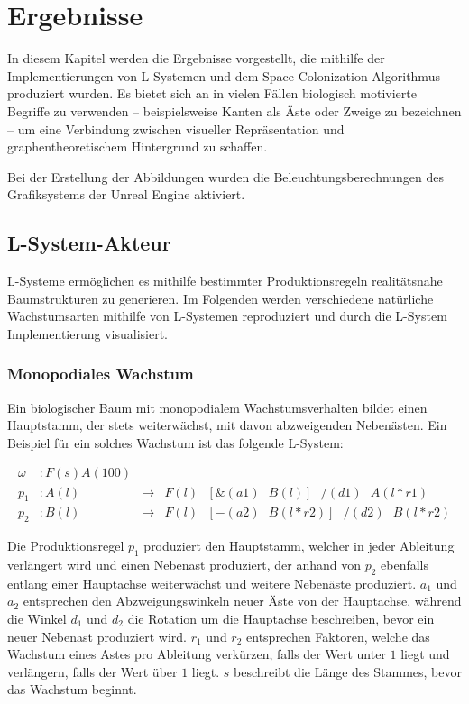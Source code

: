 \chapter{Ergebnisse}
In diesem Kapitel werden die Ergebnisse vorgestellt, die mithilfe der Implementierungen von L-Systemen und dem Space-Colonization Algorithmus produziert wurden. Es bietet sich an in vielen Fällen biologisch motivierte Begriffe zu verwenden -- beispielsweise Kanten als Äste oder Zweige zu bezeichnen -- um eine Verbindung zwischen visueller Repräsentation und graphentheoretischem Hintergrund zu schaffen.

Bei der Erstellung der Abbildungen wurden die Beleuchtungsberechnungen des Grafiksystems der Unreal Engine aktiviert.
\section{L-System-Akteur}
L-Systeme ermöglichen es mithilfe bestimmter Produktionsregeln realitätsnahe Baumstrukturen zu generieren. Im Folgenden werden verschiedene natürliche Wachstumsarten mithilfe von L-Systemen reproduziert und durch die L-System Implementierung visualisiert.
\subsection{Monopodiales Wachstum}
Ein biologischer Baum mit monopodialem Wachstumsverhalten bildet einen Hauptstamm, der stets weiterwächst, mit davon abzweigenden Nebenästen. \cite[S.21]{Forstbonatik:17} Ein Beispiel für ein solches Wachstum ist das folgende L-System:

\begin{equation}
\begin{array}{llll}
\omega & : F(s)A(100) \\
p_1 & : A(l) &\rightarrow& F(l)\text{ }[\&(a1)\text{ }B(l)]\text{ }/(d1)\text{ }A(l*r1) \\
p_2 &  : B(l) &\rightarrow& F(l)\text{ }[-(a2)\text{ }B(l*r2)]\text{ }/(d2)\text{ }B(l*r2)
\end{array}
\label{eq:ProdMonopodial}
\end{equation} 
\cite[S.56]{ABOP:04}

Die Produktionsregel $p_1$ produziert den Hauptstamm, welcher in jeder Ableitung verlängert wird und einen Nebenast produziert, der anhand von $p_2$ ebenfalls entlang einer Hauptachse weiterwächst und weitere Nebenäste produziert. $a_1$ und $a_2$ entsprechen den Abzweigungswinkeln neuer Äste von der Hauptachse, während die Winkel $d_1$ und $d_2$ die Rotation um die Hauptachse beschreiben, bevor ein neuer Nebenast produziert wird. $r_1$ und $r_2$ entsprechen Faktoren, welche das Wachstum eines Astes pro Ableitung verkürzen, falls der Wert unter $1$ liegt und verlängern, falls der Wert über $1$ liegt. $s$ beschreibt die Länge des Stammes, bevor das Wachstum beginnt. \cite[S.57]{ABOP:04}


